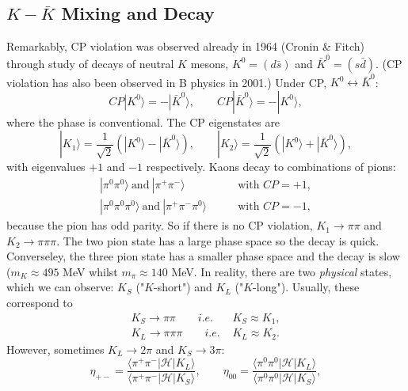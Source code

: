 \subsection{$K-\bar{K}$ Mixing and Decay}
%
Remarkably, CP violation was observed already in 1964 (Cronin \& Fitch) through study of decays of neutral $K$ mesons, $K^0=(d\bar{s})$ and $\bar{K}^0=(s\bar{d})$. (CP violation has also been observed in B physics in 2001.) Under CP, $K^0 \leftrightarrow \bar{K}^0$:
\begin{equation}
CP|K^0\rangle = -|\bar{K}^0 \rangle, \qquad CP|\bar{K}^0 \rangle = -|K^0\rangle,
\end{equation}
where the phase is conventional. The CP eigenstates are
\begin{equation}
|K_1\rangle = \frac{1}{\sqrt{2}}(|K^0\rangle - |\bar{K}^0\rangle), \qquad |K_2\rangle = \frac{1}{\sqrt{2}}(|K^0\rangle + |\bar{K}^0\rangle),
\end{equation}
with eigenvalues $+1$ and $-1$ respectively. Kaons decay to combinations of pions:
\begin{equation}
\begin{split}
|\pi^0\pi^0\rangle\ \text{and} \ |\pi^+\pi^-\rangle \qquad &\text{with }CP=+1, \\
|\pi^0\pi^0\pi^0\rangle\ \text{and} \ |\pi^+\pi^-\pi^0\rangle \qquad &\text{with }CP=-1,
\end{split}
\end{equation}
because the pion has odd parity. So if there is no CP violation, $K_1 \to \pi\pi$ and $K_2 \to \pi\pi\pi$. The two pion state has a large phase space so the decay is quick. Converseley, the three pion state has a smaller phase space and the decay is slow ($m_K \approx 495$ MeV whilst $m_\pi \approx 140$ MeV. In reality, there are two \textit{physical} states, which we can observe: $K_S$ ("$K$-short") and $K_L$ ("$K$-long"). Usually, these correspond to 
\begin{equation}
\begin{split}
K_S \to \pi\pi \qquad \textit{i.e. } &K_S \approx K_1, \\
K_L \to \pi\pi\pi \qquad \textit{i.e. } &K_L \approx K_2.
\end{split}
\end{equation}
However, sometimes $K_L \to 2\pi$ and $K_S \to 3\pi$:
\begin{equation}
\eta_{+-} = \frac{\langle\pi^+\pi^-|\mathcal{H}|K_L\rangle}{\langle \pi^+\pi^- |\mathcal{H}|K_S \rangle}, \qquad 
\eta_{00} = \frac{\langle\pi^0\pi^0|\mathcal{H}|K_L\rangle}{\langle \pi^0\pi^0 |\mathcal{H}|K_S \rangle},
\end{equation}
